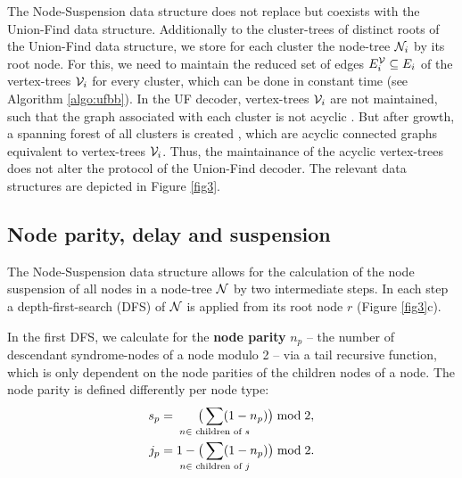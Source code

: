 The Node-Suspension data structure does not replace but coexists with the Union-Find data structure. Additionally to the cluster-trees of distinct roots of the Union-Find data structure, we store for each cluster the node-tree $\mathcal{N}_i$ by its root node. For this, we need to maintain the reduced set of edges $E^{\mathcal{V}}_i \subseteq E_i$ of the vertex-trees $\mathcal{V}_i$ for every cluster, which can be done in constant time (see Algorithm \ref{algo:ufbb}). In the UF decoder, vertex-trees $\mathcal{V}_i$ are not maintained, such that the graph associated with each cluster is not acyclic \cite{delfosse2017almost}. But after growth, a spanning forest of all clusters is created \cite{delfosse2017linear}, which are acyclic connected graphs equivalent to vertex-trees $\mathcal{V}_i$. Thus, the maintainance of the acyclic vertex-trees does not alter the protocol of the Union-Find decoder. The relevant data structures are depicted in Figure \ref{fig3}. 


\subsection{Node parity, delay and suspension}\label{sec:paritydelaysus}

The Node-Suspension data structure allows for the calculation of the node suspension of all nodes in a node-tree $\mathcal{N}$ by two intermediate steps. In each step a depth-first-search (DFS) of $\mathcal{N}$ is applied from its root node $r$ (Figure \ref{fig3}c).

In the first DFS, we calculate for the \textbf{node parity} $n_p$ -- the number of descendant syndrome-nodes of a node modulo 2 -- via a tail recursive function, which is only dependent on the node parities of the children nodes of a node. The node parity is defined differently per node type:
\begin{align}\label{eq:nodeparity}
    s_p &= \hspace{.6cm}\big( \sum_{\mathclap{n \in \text{ children of } s}} (1-n_p) \big ) \bmod 2,\\
    j_p &= 1 - \big(\sum_{\mathclap{n \in \text{ children of } j}} (1-n_p) \big) \bmod 2.
\end{align}

